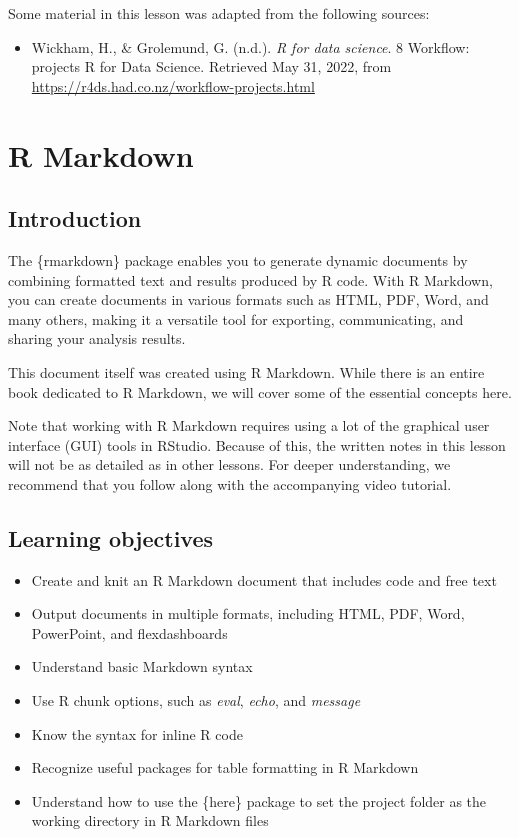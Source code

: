 \documentclass[
  letterpaper,
  DIV=11,
  numbers=noendperiod]{scrreprt}
\providecommand{\tightlist}{%
  \setlength{\itemsep}{0pt}\setlength{\parskip}{0pt}}\usepackage{longtable,booktabs,array}
\begin{document}

Some material in this lesson was adapted from the following sources:

\begin{itemize}
\tightlist
\item
  Wickham, H., \& Grolemund, G. (n.d.). \emph{R for data science}. 8
  Workflow: projects \textbar{} R for Data Science. Retrieved May 31,
  2022, from \url{https://r4ds.had.co.nz/workflow-projects.html}
\end{itemize}

\chapter{R Markdown}\label{r-markdown}

\section{Introduction}\label{introduction-6}

The \{rmarkdown\} package enables you to generate dynamic documents by
combining formatted text and results produced by R code. With R
Markdown, you can create documents in various formats such as HTML, PDF,
Word, and many others, making it a versatile tool for exporting,
communicating, and sharing your analysis results.

This document itself was created using R Markdown. While there is an
entire book dedicated to R Markdown, we will cover some of the essential
concepts here.

Note that working with R Markdown requires using a lot of the graphical
user interface (GUI) tools in RStudio. Because of this, the written
notes in this lesson will not be as detailed as in other lessons. For
deeper understanding, we recommend that you follow along with the
accompanying video tutorial.

\section*{Learning objectives}\label{learning-objectives-4}


\begin{itemize}
\tightlist
\item
  Create and knit an R Markdown document that includes code and free
  text
\item
  Output documents in multiple formats, including HTML, PDF, Word,
  PowerPoint, and flexdashboards
\item
  Understand basic Markdown syntax
\item
  Use R chunk options, such as \emph{eval}, \emph{echo}, and
  \emph{message}
\item
  Know the syntax for inline R code
\item
  Recognize useful packages for table formatting in R Markdown
\item
  Understand how to use the \{here\} package to set the project folder
  as the working directory in R Markdown files
\end{itemize}
\end{document}
